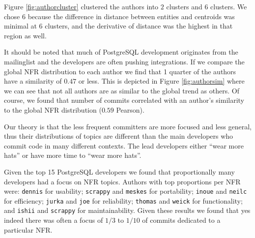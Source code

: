 \documentclass[smallextended]{svjour3}       %
\begin{document}
Figure \ref{fig:authorcluster} clustered the authors into $2$ clusters
and $6$ clusters. We chose $6$ because the difference in distance
between entities and centroids was minimal at $6$ clusters, and the
derivative of distance was the highest in that region as well.

It should be noted that much of PostgreSQL development originates from
the mailinglist and the developers are often pushing integrations. If
we compare the global NFR distribution to each author we find that 1
quarter of the authors have a similarity of $0.47$ or less. This is
depicted in Figure \ref{fig:authorsim} where we can see that not all
authors are as similar to the global trend as others. Of course, we
found that number of commits correlated with an author's similarity to the
global NFR distribution ($0.59$ Pearson).


Our theory is that the less frequent committers are more
focused and less general, thus their distributions of topics are
different than the main developers who commit code in many different
contexts.  The lead developers either ``wear more hats'' or have more
time to ``wear more hats''.

Given the top 15 PostgreSQL developers we found that proportionally many
developers had a focus on NFR topics. Authors with top proportions per NFR
were:
\texttt{dennis} for usability; 
\texttt{scrappy} and \texttt{meskes} for portability;
\texttt{inoue} and \texttt{neilc} for efficiency;
\texttt{jurka} and \texttt{joe} for reliability;
\texttt{thomas} and \texttt{weick} for functionality;
and \texttt{ishii} and \texttt{scrappy} for maintainability.
Given these results we found that yes indeed there was often a focus
of $1/3$ to $1/10$ of commits dedicated to a particular NFR.



\end{document}
